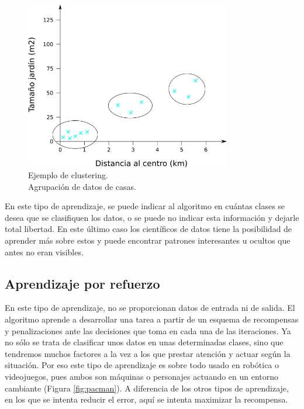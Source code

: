 \begin{figure} [h!]
  \begin{center}
    \includegraphics[width=9cm]{figs/ejemplo_no_supervisado.png}
  \end{center}
  \caption{Ejemplo de clustering.\\
            Agrupación de datos de casas.}
  \label{fig:ejemplo_clustering}
\end{figure}

En este tipo de aprendizaje, se puede indicar al algoritmo en cuántas clases se desea que se clasifiquen los datos, o se puede no indicar esta información y dejarle total libertad. En este último caso los científicos de datos tiene la posibilidad de aprender más sobre estos y puede encontrar patrones interesantes u ocultos que antes no eran visibles.

\subsection{Aprendizaje por refuerzo}

En este tipo de aprendizaje, no se proporcionan datos de entrada ni de salida. El algoritmo aprende a desarrollar una tarea a partir de un esquema de recompensas y penalizaciones ante las decisiones que toma en cada una de las iteraciones. Ya no sólo se trata de clasificar unos datos en unas determinadas clases, sino que tendremos muchos factores a la vez a los que prestar atención y actuar según la situación. Por eso este tipo de aprendizaje es sobre todo usado en robótica o videojuegos, pues ambos son máquinas o personajes actuando en un entorno cambiante (Figura \ref{fig:pacman}). A diferencia de los otros tipos de aprendizaje, en los que se intenta reducir el error, aquí se intenta maximizar la recompensa.

